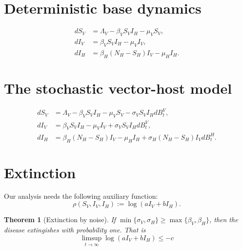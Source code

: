 \documentclass{amsart}
\theoremstyle{plain}
\newtheorem{theorem}{Theorem}
\theoremstyle{definition}
\begin{document}
\section{Deterministic base dynamics}
   \begin{equation}
       \begin{aligned}
           d S_V &= \Lambda_V - \beta_V S_V I_H - \mu_V S_V, \\
           d I_V &= \beta_V S_V I_H - \mu_V I_V, \\
           d I_H &= \beta_H (N_H - S_H) I_V - \mu_H I_H.
       \end{aligned}
   \end{equation}

\section{The stochastic vector-host model}
   \begin{equation} \label{eqn:sto_vector_host}
       \begin{aligned}
           d S_V &= \Lambda_V - \beta_V S_V I_H - \mu_V S_V 
                 - \sigma_V S_V I_H dB_t^V,
                \\
           d I_V &= \beta_V S_V I_H - \mu_V I_V 
                + \sigma_V S_V I_H dB_t^V,
                \\
           d I_H &= \beta_H (N_H - S_H) I_V - \mu_H I_H
                + \sigma_H (N_H - S_H) I_V d B^H_t .
       \end{aligned}
   \end{equation}
\section{Extinction}
    Our analysis needs the following auxiliary function:
    \begin{equation}
        \rho (S_V, I_V, I_H) := \log (a I_V + b I_H) .
    \end{equation}
 
    \begin{theorem}[Extinction by noise]
        If $\min\{\sigma_V, \sigma_H\} \geq \max\{\beta_V, \beta_H\}$,
        then the disease extingishes with probability one.  That is
        $$
            \limsup_{t \to \infty} \log (a I_V + b I_H) \leq - c
        $$
    \end{theorem}
\end{document}
